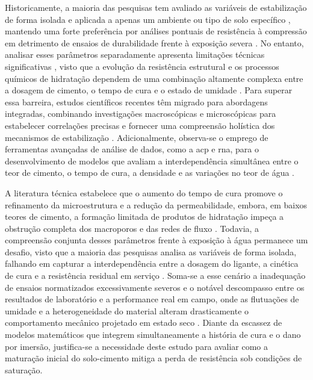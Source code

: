 
    Historicamente, a maioria das pesquisas tem avaliado as variáveis de estabilização de forma isolada e aplicada a apenas um ambiente ou tipo de solo específico , mantendo uma forte preferência por análises pontuais de resistência à compressão em detrimento de ensaios de durabilidade frente à exposição severa \cite{Khunaprapakorn2025, Junior2024}. No entanto, analisar esses parâmetros separadamente apresenta limitações técnicas significativas , visto que a evolução da resistência estrutural e os processos químicos de hidratação dependem de uma combinação altamente complexa entre a dosagem de cimento, o tempo de cura e o estado de umidade \cite{Abdallah2023}. Para superar essa barreira, estudos científicos recentes têm migrado para abordagens integradas, combinando investigações macroscópicas e microscópicas para estabelecer correlações precisas e fornecer uma compreensão holística dos mecanismos de estabilização \cite{Yang2024}. Adicionalmente, observa-se o emprego de ferramentas avançadas de análise de dados, como a \gls{acp}  e \gls{rna}, para o desenvolvimento de modelos que avaliam a interdependência simultânea entre o teor de cimento, o tempo de cura, a densidade e as variações no teor de água \cite{Abdallah2023}.


    A literatura técnica estabelece que o aumento do tempo de cura promove o refinamento da microestrutura e a redução da permeabilidade, embora, em baixos teores de cimento, a formação limitada de produtos de hidratação impeça a obstrução completa dos macroporos e das redes de fluxo \cite{Javed2025}. Todavia, a compreensão conjunta desses parâmetros frente à exposição à água permanece um desafio, visto que a maioria das pesquisas analisa as variáveis de forma isolada, falhando em capturar a interdependência entre a dosagem do ligante, a cinética de cura e a resistência residual em serviço \cite{Abdallah2023, Pham2022, Giada2019, Morel2021}. Soma-se a esse cenário a inadequação de ensaios normatizados excessivamente severos e o notável descompasso entre os resultados de laboratório e a performance real em campo, onde as flutuações de umidade e a heterogeneidade do material alteram drasticamente o comportamento mecânico projetado em estado seco \cite{Traore2021, Tarham2024, Giada2019, Khunaprapakorn2025, Morel2021}. Diante da escassez de modelos matemáticos que integrem simultaneamente a história de cura e o dano por imersão, justifica-se a necessidade deste estudo para avaliar como a maturação inicial do solo-cimento mitiga a perda de resistência sob condições de saturação.


